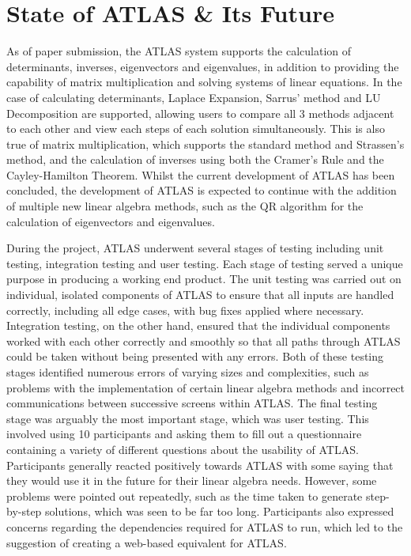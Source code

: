 \documentclass[
]{ceurart}
\begin{document}
\section{State of ATLAS \& Its Future}
As of paper submission, the ATLAS system supports the calculation of determinants, inverses, eigenvectors and eigenvalues, in addition to providing the capability of matrix multiplication and solving systems of linear equations. In the case of calculating determinants, Laplace Expansion, Sarrus' method and LU Decomposition are supported, allowing users to compare all 3 methods adjacent to each other and view each steps of each solution simultaneously. This is also true of matrix multiplication, which supports the standard method and Strassen's method, and the calculation of inverses using both the Cramer's Rule and the Cayley-Hamilton Theorem. Whilst the current development of ATLAS has been concluded, the development of ATLAS is expected to continue with the addition of multiple new linear algebra methods, such as the QR algorithm for the calculation of eigenvectors and eigenvalues.

During the project, ATLAS underwent several stages of testing including unit testing, integration testing and user testing. Each stage of testing served a unique purpose in producing a working end product. The unit testing was carried out on individual, isolated components of ATLAS to ensure that all inputs are handled correctly, including all edge cases, with bug fixes applied where necessary. Integration testing, on the other hand, ensured that the individual components worked with each other correctly and smoothly so that all paths through ATLAS could be taken without being presented with any errors. Both of these testing stages identified numerous errors of varying sizes and complexities, such as problems with the implementation of certain linear algebra methods and incorrect communications between successive screens within ATLAS. The final testing stage was arguably the most important stage, which was user testing. This involved using 10 participants and asking them to fill out a questionnaire containing a variety of different questions about the usability of ATLAS. Participants generally reacted positively towards ATLAS with some saying that they would use it in the future for their linear algebra needs. However, some problems were pointed out repeatedly, such as the time taken to generate step-by-step solutions, which was seen to be far too long. Participants also expressed concerns regarding the dependencies required for ATLAS to run, which led to the suggestion of creating a web-based equivalent for ATLAS.
\end{document}
